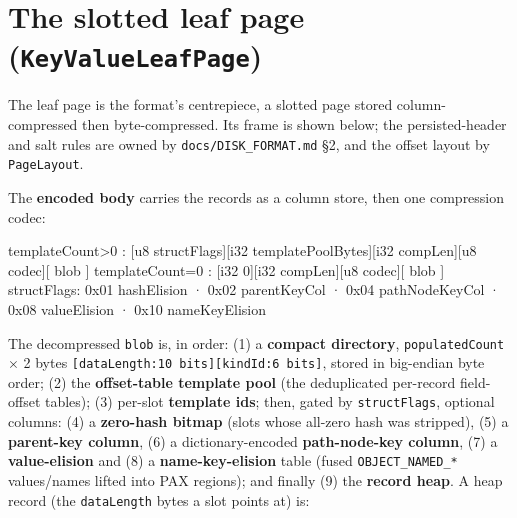 \documentclass[11pt,a4paper,oneside]{report}
\theoremstyle{sirixthm}
\newcommand{\code}[1]{\texttt{#1}}
\begin{document}
\section{The slotted leaf page (\texttt{KeyValueLeafPage})}

The leaf page is the format's centrepiece, a slotted page stored column-compressed then
byte-compressed. Its frame is shown below; the persisted-header and salt rules are owned by
\code{docs/DISK\_FORMAT.md} §2, and the offset layout by \code{PageLayout}.

\begin{diagramS}
\end{diagramS}

The \textbf{encoded body} carries the records as a column store, then one compression codec:

\begin{diagramS}
[i32 populatedCount][i32 onDiskHeapSize][u8 templateCount]
 templateCount>0 :  [u8 structFlags][i32 templatePoolBytes][i32 compLen][u8 codec][ blob ]
 templateCount=0 :  [i32 0][i32 compLen][u8 codec][ blob ]
structFlags: 0x01 hashElision · 0x02 parentKeyCol · 0x04 pathNodeKeyCol · 0x08 valueElision · 0x10 nameKeyElision
\end{diagramS}

The decompressed \code{blob} is, in order: (1) a \textbf{compact directory}, \code{populatedCount}
$\times$ 2 bytes \code{[dataLength:10 bits][kindId:6 bits]}, stored in big-endian byte order; (2) the
\textbf{offset-table template pool} (the
deduplicated per-record field-offset tables); (3) per-slot \textbf{template ids}; then, gated by
\code{structFlags}, optional columns: (4) a \textbf{zero-hash bitmap} (slots whose all-zero hash was
stripped), (5) a \textbf{parent-key column}, (6) a dictionary-encoded \textbf{path-node-key column},
(7) a \textbf{value-elision} and (8) a \textbf{name-key-elision} table (fused \code{OBJECT\_NAMED\_*}
values/names lifted into PAX regions); and finally (9) the \textbf{record heap}. A heap record (the
\code{dataLength} bytes a slot points at) is:

\begin{diagramS}
\end{diagramS}
\end{document}
